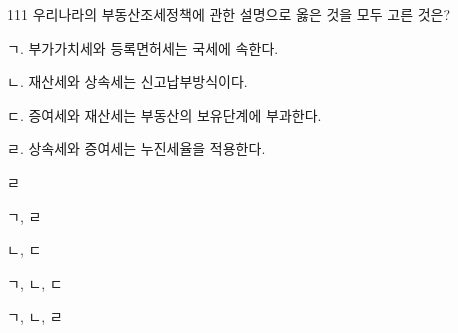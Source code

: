 \begin{question}{111}
우리나라의 부동산조세정책에 관한 설명으로 옳은 것을 모두 고른 것은?
\begin{framedtext}
ㄱ. 부가가치세와 등록면허세는 국세에 속한다. \par
ㄴ. 재산세와 상속세는 신고납부방식이다. \par
ㄷ. 증여세와 재산세는 부동산의 보유단계에 부과한다. \par
ㄹ. 상속세와 증여세는 누진세율을 적용한다. \par
\end{framedtext}
\begin{choices}
  \item ㄹ
  \item ㄱ, ㄹ
  \item ㄴ, ㄷ
  \item ㄱ, ㄴ, ㄷ
  \item ㄱ, ㄴ, ㄹ
\end{choices}
\end{question}
